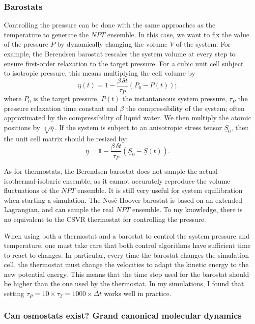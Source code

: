 \documentclass[thesis]{subfiles}
\begin{document}
\subsubsection{Barostats}

Controlling the pressure can be done with the same approaches as the temperature
to generate the $NPT$ ensemble. In this case, we want to fix the value of the
pressure $P$ by dynamically changing the volume $V$ of the system. For example,
the Berendsen barostat\cite{Berendsen1984} rescales the system volume at every
step to ensure first-order relaxation to the target pressure. For a cubic unit
cell subject to isotropic pressure, this means multiplying the cell volume by
\[ \eta(t) = 1 - \frac{\beta\,\delta t}{\tau_P} \left(P_0 - P(t)\right);\]
where $P_0$ is the target pressure, $P(t)$ the instantaneous system pressure,
$\tau_P$ the pressure relaxation time constant and $\beta$ the compressibility
of the system; often approximated by the compressibility of liquid water. We
then multiply the atomic positions by $\sqrt[3]{\eta}$. If the system is subject
to an anisotropic stress tensor $\underline{S}_0$, then the unit cell matrix
should be resized by:
\[ \underline{\eta} = \mathds{1} - \frac{\beta\,\delta t}{\tau_P} \left(\underline{S}_0 - \underline{S}(t)\right). \]

As for thermostats, the Berendsen barostat does not sample the actual
isothermal-isobaric ensemble, as it cannot accurately reproduce the volume
fluctuations of the $NPT$ ensemble. It is still very useful for system
equilibration when starting a simulation. The Nosé-Hoover barostat is based on
an extended Lagrangian, and can sample the real $NPT$
ensemble\cite{Tuckerman2010}. To my knowledge, there is no equivalent to the
CSVR thermostat for controlling the pressure.

When using both a thermostat and a barostat to control the system pressure and
temperature, one must take care that both control algorithms have sufficient
time to react to changes. In particular, every time the barostat changes the
simulation cell, the thermostat must change the velocities to adapt the kinetic
energy to the new potential energy. This means that the time step used for the
barostat should be higher than the one used by the thermostat. In my
simulations, I found that setting $\tau_P = 10 \times \tau_T = 1000 \times \Delta
t$ works well in practice.

\subsubsection{Can osmostats exist? Grand canonical molecular dynamics}
\label{sec:gcmd}
\end{document}
